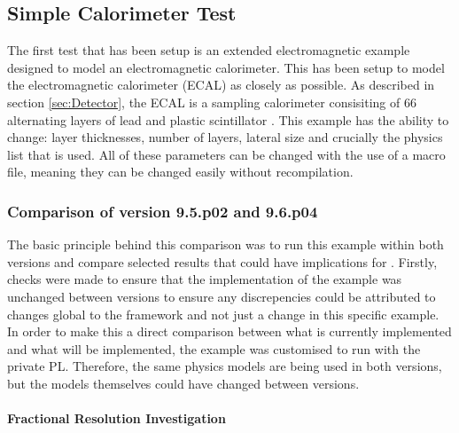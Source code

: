 
\subsection{Simple Calorimeter Test}
\label{sec:Simple Calorimeter Test}
The first test that has been setup is an extended electromagnetic \geant example designed to model an electromagnetic calorimeter.  This has been setup to model the \lhcb electromagnetic calorimeter (ECAL) as closely as possible. As described in section \ref{sec:Detector}, the \lhcb ECAL is a sampling calorimeter consisiting of 66 alternating layers of lead and plastic scintillator \cite{LHCb-TDR-002}.  This example has the ability to change: layer thicknesses, number of layers, lateral size and crucially the physics list that is used. All of these parameters can be changed with the use of a \geant macro file, meaning they can be changed easily without recompilation. 

\subsubsection{Comparison of \geant version 9.5.p02 and 9.6.p04}
The basic principle behind this comparison was to run this example within both \geant versions and compare selected results that could have implications for \lhcb.  Firstly, checks were made to ensure that the implementation of the example was unchanged between versions to ensure any discrepencies could be attributed to changes global to the \geant framework and not just a change in this specific example.  In order to make this a direct comparison between what is currently implemented and what will be implemented, the example was customised to run with the \lhcb private PL.  Therefore, the same physics models are being used in both versions, but the models themselves could have changed between versions.

\paragraph{Fractional Resolution Investigation}
\label{sec:Fractional Resolution Investigation}

